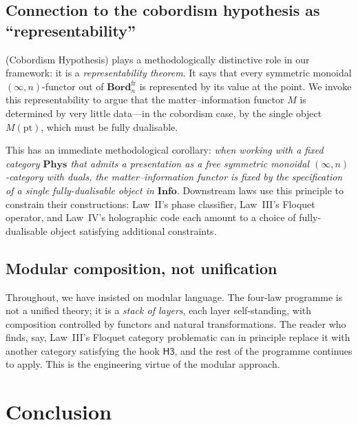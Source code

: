\documentclass[12pt]{article}
\theoremstyle{definition}
\theoremstyle{remark}
\newcommand{\Phys}{\mathbf{Phys}}
\newcommand{\Info}{\mathbf{Info}}
\newcommand{\Bord}{\mathbf{Bord}}
\begin{document}
\subsection{Connection to the cobordism hypothesis as ``representability''}

 (Cobordism Hypothesis) plays a methodologically distinctive role in our framework: it is a \emph{representability theorem}. It says that every symmetric monoidal $(\infty,n)$-functor out of $\Bord_n^{\mathrm{fr}}$ is represented by its value at the point. We invoke this representability to argue that the matter--information functor $M$ is determined by very little data---in the cobordism case, by the single object $M(\mathrm{pt})$, which must be fully dualisable.

This has an immediate methodological corollary: \emph{when working with a fixed category $\Phys$ that admits a presentation as a free symmetric monoidal $(\infty,n)$-category with duals, the matter--information functor is fixed by the specification of a single fully-dualisable object in $\Info$}. Downstream laws use this principle to constrain their constructions: Law~II's phase classifier, Law~III's Floquet operator, and Law~IV's holographic code each amount to a choice of fully-dualisable object satisfying additional constraints.

\subsection{Modular composition, not unification}

Throughout, we have insisted on modular language. The four-law programme is not a unified theory; it is a \emph{stack of layers}, each layer self-standing, with composition controlled by functors and natural transformations. The reader who finds, say, Law~III's Floquet category problematic can in principle replace it with another category satisfying the hook $\mathsf{H3}$, and the rest of the programme continues to apply. This is the engineering virtue of the modular approach.

\section{Conclusion}
\label{sec:conclusion}
\end{document}
